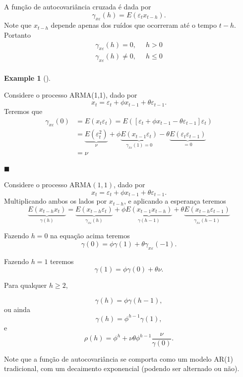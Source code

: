 \documentclass[
  letterpaper,
  DIV=11,
  numbers=noendperiod]{scrartcl}
\theoremstyle{definition}
\newtheorem{example}{Example}[chapter]
\theoremstyle{definition}
\theoremstyle{plain}
\theoremstyle{plain}
\theoremstyle{remark}
\begin{document}
A função de autocovariância cruzada é dada por \begin{equation}
      \gamma_{x\varepsilon}(h)=E(\varepsilon_t x_{t-h}).
    \end{equation} Note que \(x_{t-h}\) depende apenas dos ruídos que
ocorreram até o tempo \(t-h\). Portanto \begin{align}
     \gamma_{x\varepsilon}(h)=0,&\;\; h>0 \\
     \gamma_{x\varepsilon}(h)\neq 0,&\;\; h\leq 0 \\
    \end{align}

\begin{example}[]\protect\hypertarget{exm-}{}\label{exm-}

Considere o processo ARMA(1,1), dado por
\[x_t = \varepsilon_{t} + \phi x_{t-1} + \theta\varepsilon_{t-1}.\]
Teremos que \begin{align*}
\gamma_{x\varepsilon}(0)&=E(x_t\varepsilon_t) = E( \left[\varepsilon_t + \phi x_{t-1} - \theta\varepsilon_{t-1} \right]\varepsilon_t)\\
&=\underbrace{E(\varepsilon_t^2)}_{\nu}+ \phi\underbrace{ E(x_{t-1}\varepsilon_t)}_{\gamma_{x\varepsilon}(1)=0} -\theta \underbrace{E(\varepsilon_{t}\varepsilon_{t-1})}_{=0} \\
&=\nu
\end{align*}

\(\blacksquare\)

\end{example}

Considere o processo ARMA\((1,1)\), dado por
\[x_t = \varepsilon_{t} + \phi x_{t-1} + \theta\varepsilon_{t-1}.\]
Multiplicando ambos os lados por \(x_{t-h}\), e aplicando a esperança
teremos \[
    \underbrace{E(x_{t-h}x_t)}_{\gamma(h)} = \underbrace{E(x_{t-h}\varepsilon_{t})}_{\gamma_{x\varepsilon}(h)} + \phi \underbrace{E(x_{t-1}x_{t-h})}_{\gamma(h-1)} + \theta \underbrace{E(x_{t-h}\varepsilon_{t-1})}_{\gamma_{x\varepsilon}(h-1)}
    \]

Fazendo \(h=0\) na equação acima teremos
\[\gamma(0)=\phi\gamma(1) + \theta\gamma_{x\varepsilon}(-1).\]

Fazendo \(h=1\) teremos \[\gamma(1)=\phi\gamma(0)+\theta\nu.\]

Para qualquer \(h\geq 2\),

\[\gamma(h)=\phi\gamma(h-1),\] ou ainda
\[\gamma(h)=\phi^{h-1}\gamma(1),\] e
\[\rho(h)=\phi^h+\nu\theta\phi^{h-1}\frac{\nu}{\gamma(0)}.\]

Note que a função de autocovariância se comporta como um modelo AR(1)
tradicional, com um decaimento exponencial (podendo ser alternado ou
não).
\end{document}
